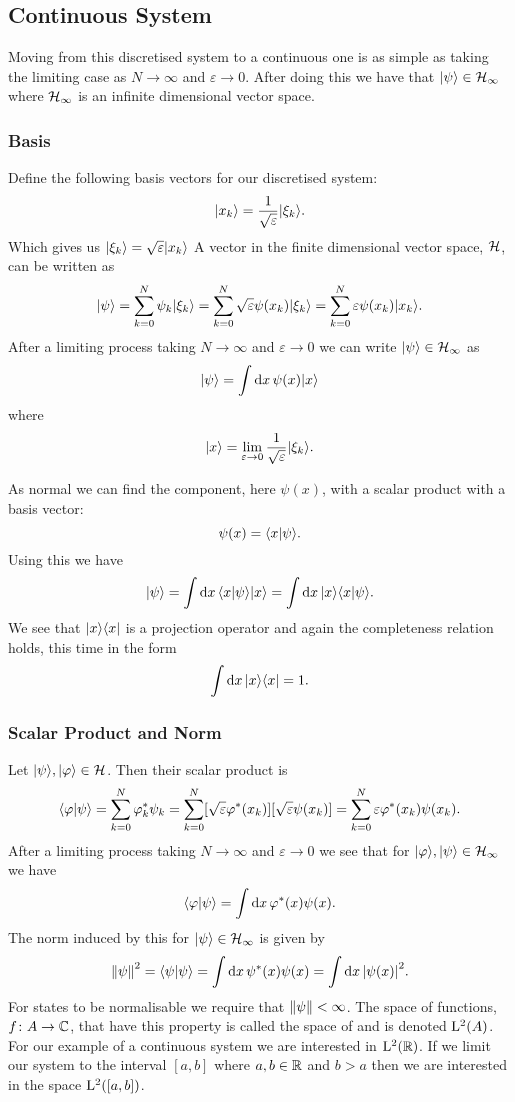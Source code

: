     \subsection{Continuous System}
    Moving from this discretised system to a continuous one is as simple as taking the limiting case as \(N \to \infty\) and \(\varepsilon \to 0\).
    After doing this we have that \(\vert {\psi} \rangle\in\mathcal{H}_\infty\) where \(\mathcal{H}_\infty\) is an infinite dimensional vector space.
    
    \subsubsection{Basis}
    Define the following basis vectors for our discretised system:
    \[\vert {x_k} \rangle = \frac{1}{\sqrt{\varepsilon}}\vert {\xi_k} \rangle.\]
    Which gives us \(\vert {\xi_k} \rangle = \sqrt{\varepsilon}\vert {x_k} \rangle\)
    A vector in the finite dimensional vector space, \(\mathcal{H}\), can be written as
    \[\vert {\psi} \rangle = \sum_{k=0}^{N} \psi_k\vert {\xi_k} \rangle = \sum_{k=0}^{N} \sqrt{\varepsilon}\psi(x_k)\vert {\xi_k} \rangle = \sum_{k=0}^{N} \varepsilon\psi(x_k)\vert {x_k} \rangle.\]
    After a limiting process taking \(N\to\infty\) and \(\varepsilon\to 0\) we can write \(\vert {\psi} \rangle\in\mathcal{H}_{\infty}\) as
    \[\vert {\psi} \rangle = \int\dd{x}\psi(x)\vert {x} \rangle\]
    where
    \[\vert {x} \rangle = \lim_{\varepsilon\to 0}\frac{1}{\sqrt{\varepsilon}}\vert {\xi_k} \rangle.\]
    
    As normal we can find the component, here \(\psi(x)\), with a scalar product with a basis vector:
    \[\psi(x) = \langle {x} \vert {\psi} \rangle.\]
    Using this we have
    \[\vert {\psi} \rangle = \int\dd{x}\langle {x} \vert {\psi} \rangle\vert {x} \rangle = \int\dd{x}\vert {x} \rangle\langle {x} \vert {\psi} \rangle.\]
    We see that \(\vert {x}\rangle\langle {x} \vert\) is a projection operator and again the completeness relation holds, this time in the form
    \[\int\dd{x}\vert {x}\rangle\langle {x} \vert = 1.\]
    
    \subsubsection{Scalar Product and Norm}
    Let \(\vert {\psi} \rangle, \vert {\varphi} \rangle\in\mathcal{H}\).
    Then their scalar product is
    \[\langle {\varphi} \vert {\psi} \rangle = \sum_{k=0}^{N} \varphi_k^*\psi_k = \sum_{k=0}^{N}[\sqrt{\varepsilon}\varphi^*(x_k)][\sqrt{\varepsilon}\psi(x_k)] = \sum_{k=0}^{N}\varepsilon\varphi^*(x_k)\psi(x_k).\]
    After a limiting process taking \(N\to\infty\) and \(\varepsilon\to 0\) we see that for \(\vert {\varphi} \rangle, \vert {\psi} \rangle\in\mathcal{H}_\infty\) we have
    \[\langle {\varphi} \vert {\psi} \rangle = \int\dd{x}\varphi^*(x)\psi(x).\]
    The norm induced by this for \(\vert {\psi} \rangle\in\mathcal{H}_\infty\) is given by
    \[\norm{\psi}^2 = \langle {\psi} \vert {\psi} \rangle = \int\dd{x}\psi^*(x)\psi(x) = \int\dd{x}\abs{\psi(x)}^2.\]
    For states to be normalisable we require that \(\norm{\psi} < \infty\).
    The space of functions, \(f\colon A\to \mathbb{C}\), that have this property is called the space of  and is denoted \(\operatorname{L^2}(A)\).
    For our example of a continuous system we are interested in \(\operatorname{L^2}(\mathbb{R})\).
    If we limit our system to the interval \([a, b]\) where \(a, b\in\mathbb{R}\) and \(b > a\) then we are interested in the space \(\operatorname{L^2}([a, b])\).
    
